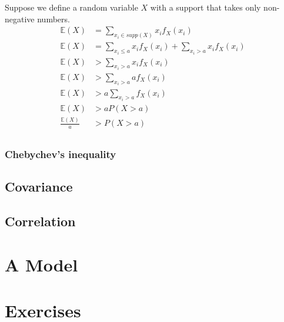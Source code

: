 Suppose we define a random variable $X$ with a support that takes only non-negative numbers.
\begin{align}
    \mathbb{E}(X) &= \sum_{ x_{i} \in supp(X)} x_{i} f_{X}(x_{i}) \\ 
    \mathbb{E}(X) &= \sum_{ x_{i} \leq a  } x_{i} f_{X}(x_{i}) + \sum_{ x_{i} > a  } x_{i} f_{X}(x_{i}) \\
    \mathbb{E}(X) &>  \sum_{ x_{i} > a  } x_{i} f_{X}(x_{i}) \\
    \mathbb{E}(X) &>  \sum_{ x_{i} > a  } a f_{X}(x_{i}) \\
    \mathbb{E}(X) &>  a \sum_{ x_{i} > a  } f_{X}(x_{i}) \\
    \mathbb{E}(X) &>  a P(X > a) \\
    \frac{\mathbb{E}(X)}{a} &>  P(X > a) \\
\end{align}



\subsubsection{Chebychev's inequality}



\subsection{Covariance}

\subsection{Correlation}



\section{A Model}

\section{Exercises}

